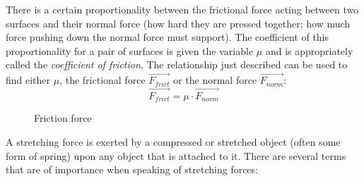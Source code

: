 There is a certain proportionality between the frictional force acting between two surfaces and their normal force (how hard they are pressed together; how much force pushing down the normal force must support). The coefficient of this proportionality for a pair of surfaces is given the variable $\mu$ and is appropriately called the \emph{coefficient of friction}. The relationship just described can be used to find either $\mu$, the frictional force $\vec{F_{frict}}$ or the normal force $\vec{F_{norm}}$: $$\vec{F_{frict}} = \mu \cdot \vec{F_{norm}}$$

\begin{figure}[h!]
	\centering
    \caption{Friction force}
\end{figure}


A stretching force is exerted by a compressed or stretched object (often some form of spring) upon any object that is attached to it. There are several terms that are of importance when speaking of stretching forces:

